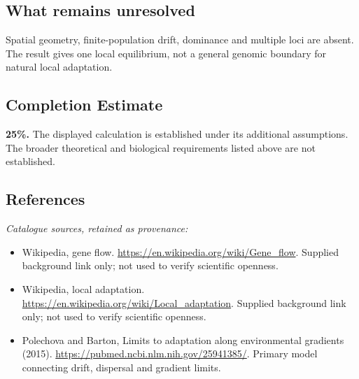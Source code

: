 \documentclass[11pt]{article}
\begin{document}
\subsection{What remains unresolved}
Spatial geometry, finite-population drift, dominance and multiple loci are absent. The result gives one local equilibrium, not a general genomic boundary for natural local adaptation.
\subsection{Completion Estimate}
\textbf{25\%.} The displayed calculation is established under its additional assumptions. The broader theoretical and biological requirements listed above are not established.
\subsection{References}
\noindent\emph{Catalogue sources, retained as provenance:}
\begin{itemize}
\item Wikipedia, gene flow. \url{https://en.wikipedia.org/wiki/Gene_flow}. Supplied background link only; not used to verify scientific openness.
\item Wikipedia, local adaptation. \url{https://en.wikipedia.org/wiki/Local_adaptation}. Supplied background link only; not used to verify scientific openness.
\item Polechova and Barton, Limits to adaptation along environmental gradients (2015). \url{https://pubmed.ncbi.nlm.nih.gov/25941385/}. Primary model connecting drift, dispersal and gradient limits.
\end{itemize}
\clearpage


\appendix
\end{document}
